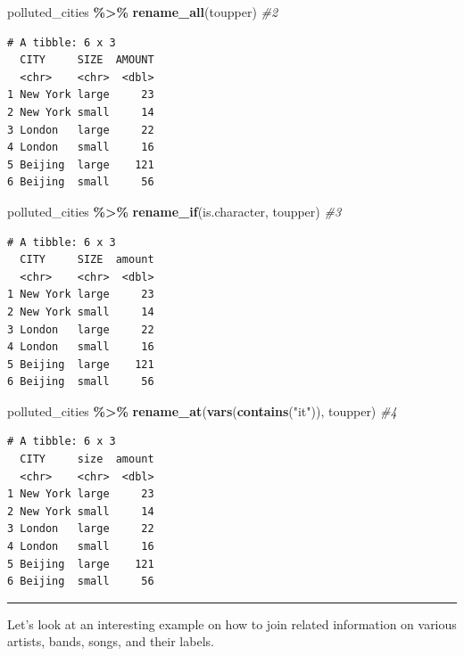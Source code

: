 \documentclass[
]{book}
\newenvironment{Shaded}{\begin{snugshade}}{\end{snugshade}}
\newcommand{\CommentTok}[1]{\textcolor[rgb]{0.56,0.35,0.01}{\textit{#1}}}
\newcommand{\FunctionTok}[1]{\textcolor[rgb]{0.13,0.29,0.53}{\textbf{#1}}}
\newcommand{\NormalTok}[1]{#1}
\newcommand{\SpecialCharTok}[1]{\textcolor[rgb]{0.81,0.36,0.00}{\textbf{#1}}}
\newcommand{\StringTok}[1]{\textcolor[rgb]{0.31,0.60,0.02}{#1}}
\begin{document}
\begin{Shaded}
\begin{Highlighting}[]
\NormalTok{polluted\_cities }\SpecialCharTok{\%\textgreater{}\%} \FunctionTok{rename\_all}\NormalTok{(toupper) }\CommentTok{\#2}
\end{Highlighting}
\end{Shaded}

\begin{verbatim}
# A tibble: 6 x 3
  CITY     SIZE  AMOUNT
  <chr>    <chr>  <dbl>
1 New York large     23
2 New York small     14
3 London   large     22
4 London   small     16
5 Beijing  large    121
6 Beijing  small     56
\end{verbatim}

\begin{Shaded}
\begin{Highlighting}[]
\NormalTok{polluted\_cities }\SpecialCharTok{\%\textgreater{}\%} \FunctionTok{rename\_if}\NormalTok{(is.character, toupper) }\CommentTok{\#3}
\end{Highlighting}
\end{Shaded}

\begin{verbatim}
# A tibble: 6 x 3
  CITY     SIZE  amount
  <chr>    <chr>  <dbl>
1 New York large     23
2 New York small     14
3 London   large     22
4 London   small     16
5 Beijing  large    121
6 Beijing  small     56
\end{verbatim}

\begin{Shaded}
\begin{Highlighting}[]
\NormalTok{polluted\_cities }\SpecialCharTok{\%\textgreater{}\%} \FunctionTok{rename\_at}\NormalTok{(}\FunctionTok{vars}\NormalTok{(}\FunctionTok{contains}\NormalTok{(}\StringTok{"it"}\NormalTok{)), toupper) }\CommentTok{\#4}
\end{Highlighting}
\end{Shaded}

\begin{verbatim}
# A tibble: 6 x 3
  CITY     size  amount
  <chr>    <chr>  <dbl>
1 New York large     23
2 New York small     14
3 London   large     22
4 London   small     16
5 Beijing  large    121
6 Beijing  small     56
\end{verbatim}

\begin{center}\rule{0.5\linewidth}{0.5pt}\end{center}

Let's look at an interesting example on how to join related information on various artists, bands, songs, and their labels.
\end{document}
